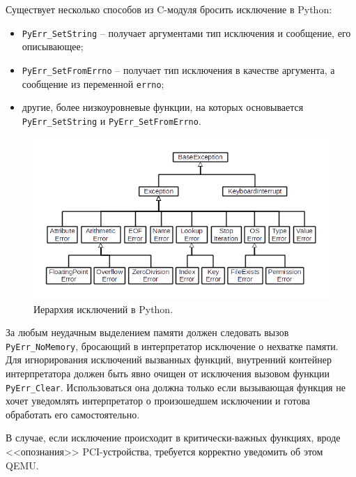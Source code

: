 Существует несколько способов из C-модуля бросить исключение в Python:
\begin{itemize}
    \item \texttt{PyErr\_SetString} -- получает аргументами тип исключения
        и сообщение, его описывающее;
    \item \texttt{PyErr\_SetFromErrno} -- получает тип исключения в качестве
        аргумента, а сообщение из переменной \texttt{errno};
    \item другие, более низкоуровневые функции, на которых основывается
        \texttt{PyErr\_SetString} и \texttt{PyErr\_SetFromErrno}.
\end{itemize}

\begin{figure}[!htbp]
    \centering
    \begin{adjustbox}{max totalsize={\textwidth}{\textheight}}
        \includegraphics[scale=1.5]{images/python_exception_hierarchy.png}
    \end{adjustbox}
    \caption{Иерархия исключений в Python.}\label{fig:python-exception-hierarchy}
\end{figure}

За любым неудачным выделением памяти должен следовать вызов \texttt{PyErr\_NoMemory},
бросающий в интерпретатор исключение о нехватке памяти.
Для игнорирования исключений вызванных функций, внутренний контейнер интерпретатора должен
быть явно очищен от исключения вызовом функции \texttt{PyErr\_Clear}.
Использоваться она должна только если вызывающая функция не хочет уведомлять интерпретатор
о произошедшем исключении и готова обработать его самостоятельно.

В случае, если исключение происходит в критически-важных функциях, вроде <<опознания>>
PCI-устройства, требуется корректно уведомить об этом QEMU.


